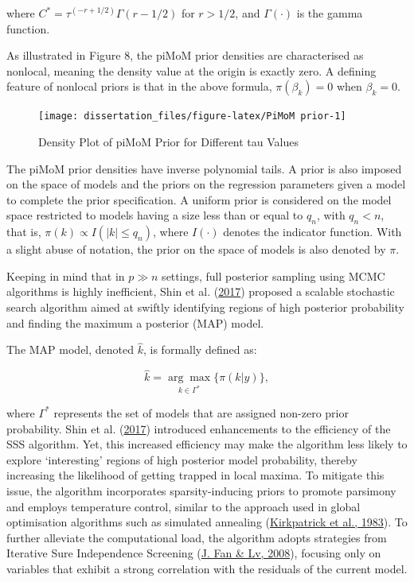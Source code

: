 \documentclass[
  11pt,
]{article}
\begin{document}
where \(C^* = \tau^{(-r+1/2)} \Gamma(r - 1/2)\) for \(r > 1/2\), and
\(\Gamma(\cdot)\) is the gamma function.

As illustrated in Figure 8, the piMoM prior densities are characterised
as nonlocal, meaning the density value at the origin is exactly zero. A
defining feature of nonlocal priors is that in the above formula,
\(\pi(\beta_k) = 0\) when \(\beta_k = 0\).

\begin{figure}[H]

{\centering \texttt{[image: dissertation\_files/figure-latex/PiMoM prior-1]} 

}

\caption{Density Plot of piMoM Prior for Different tau Values}\label{fig:PiMoM prior}
\end{figure}

The piMoM prior densities have inverse polynomial tails. A prior is also
imposed on the space of models and the priors on the regression
parameters given a model to complete the prior specification. A uniform
prior is considered on the model space restricted to models having a
size less than or equal to \(q_n\), with \(q_n < n\), that is,
\(\pi(k) \propto I(|k| \leq q_n)\), where \(I(\cdot)\) denotes the
indicator function. With a slight abuse of notation, the prior on the
space of models is also denoted by \(\pi\).

Keeping in mind that in \(p \gg n\) settings, full posterior sampling
using MCMC algorithms is highly inefficient, Shin et al.
(\protect\hyperlink{ref-Shin2018}{2017}) proposed a scalable stochastic
search algorithm aimed at swiftly identifying regions of high posterior
probability and finding the maximum a posterior (MAP) model.

The MAP model, denoted \(\hat{k}\), is formally defined as:

\begin{equation}
\hat{k} = \underset{k \in \Gamma^*}{\arg\max} \{\pi(k | y)\},
\end{equation}

where \(\Gamma^*\) represents the set of models that are assigned
non-zero prior probability. Shin et al.
(\protect\hyperlink{ref-Shin2018}{2017}) introduced enhancements to the
efficiency of the SSS algorithm. Yet, this increased efficiency may make
the algorithm less likely to explore `interesting' regions of high
posterior model probability, thereby increasing the likelihood of
getting trapped in local maxima. To mitigate this issue, the algorithm
incorporates sparsity-inducing priors to promote parsimony and employs
temperature control, similar to the approach used in global optimisation
algorithms such as simulated annealing
(\protect\hyperlink{ref-Vecchi1983}{Kirkpatrick et al., 1983}). To
further alleviate the computational load, the algorithm adopts
strategies from Iterative Sure Independence Screening
(\protect\hyperlink{ref-Fan2008}{J. Fan \& Lv, 2008}), focusing only on
variables that exhibit a strong correlation with the residuals of the
current model.
\end{document}
